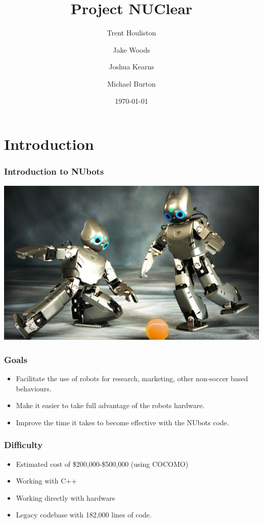 \documentclass{beamer}
\title[Short title]{Project NUClear}
\author{
	Trent Houliston \and Jake Woods \and Joshua Kearns \and Michael Burton
}
\institute[UoN]
{
	University of Newcastle \\ %
	\medskip
	\textit{\{Trent.Houliston, Jake.F.Woods, Joshua.Kearns, Michael Burton\}@uon.edu.au} %
}
\date{\today}
\begin{document}
\begin{frame} %
	\titlepage %
\end{frame}


\section{Introduction}
\begin{frame}
	\frametitle{Introduction to NUbots}
	\includegraphics[scale=.25]{Presentation_Images/darwin.jpg}
\end{frame}

\begin{frame}
	\frametitle{Goals}
	\begin{itemize}
		\item Facilitate the use of robots for research, marketing, other non-soccer based behaviours.
		\item Make it easier to take full advantage of the robots hardware.
		\item Improve the time it takes to become effective with the NUbots code.
	\end{itemize}
\end{frame}

\begin{frame}
	\frametitle{Difficulty}
	\begin{itemize}
		\item Estimated cost of \$200,000-\$500,000 (using COCOMO)
		\item Working with C++
		\item Working directly with hardware
		\item Legacy codebase with 182,000 lines of code.
	\end{itemize}
\end{frame}
\end{document}
